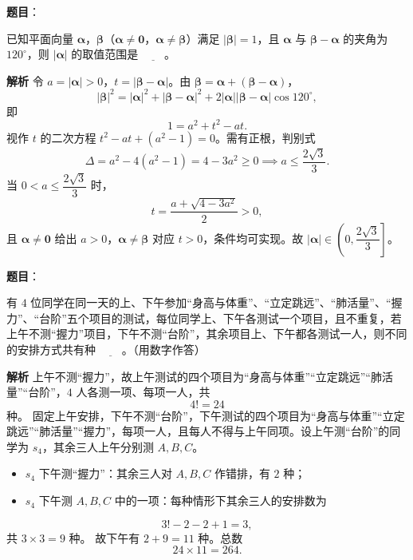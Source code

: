 \begin{answer}

\textbf{题目}：

已知平面向量 $\boldsymbol\alpha$，$\boldsymbol\beta$（$\boldsymbol\alpha\neq\mathbf 0$，$\boldsymbol\alpha\neq\boldsymbol\beta$）满足 $|\boldsymbol\beta|=1$，且 $\boldsymbol\alpha$ 与 $\boldsymbol\beta-\boldsymbol\alpha$ 的夹角为 $120^\circ$，则 $|\boldsymbol\alpha|$ 的取值范围是 $\underline{\qquad}$。

\textbf{解析}
令 $a=|\boldsymbol\alpha|>0$，$t=|\boldsymbol\beta-\boldsymbol\alpha|$。由 $\boldsymbol\beta=\boldsymbol\alpha+(\boldsymbol\beta-\boldsymbol\alpha)$，
\nopagebreak[4]
\[|\boldsymbol\beta|^2=|\boldsymbol\alpha|^2+|\boldsymbol\beta-\boldsymbol\alpha|^2
+2|\boldsymbol\alpha||\boldsymbol\beta-\boldsymbol\alpha|\cos120^\circ,\]
即
\nopagebreak[4]
\[1=a^2+t^2-at.\]
视作 $t$ 的二次方程 $t^2-at+(a^2-1)=0$。需有正根，判别式
\nopagebreak[4]
\[\Delta=a^2-4(a^2-1)=4-3a^2\geqslant0\implies a\leqslant\frac{2\sqrt3}3.\]
当 $0<a\leqslant\dfrac{2\sqrt3}3$ 时，
\nopagebreak[4]
\[t=\frac{a+\sqrt{4-3a^2}}2>0,\]
且 $\boldsymbol\alpha\neq\mathbf0$ 给出 $a>0$，$\boldsymbol\alpha\neq\boldsymbol\beta$ 对应 $t>0$，条件均可实现。故 $|\boldsymbol\alpha|\in\left(0,\dfrac{2\sqrt3}3\right]$。

\gkanswer{答案：$\left(0,\dfrac{2\sqrt3}3\right]$。}

\end{answer}
\begin{answer}

\textbf{题目}：

有 $4$ 位同学在同一天的上、下午参加“身高与体重”、“立定跳远”、“肺活量”、“握力”、“台阶”五个项目的测试，每位同学上、下午各测试一个项目，且不重复，若上午不测“握力”项目，下午不测“台阶”，其余项目上、下午都各测试一人，则不同的安排方式共有种 $\underline{\qquad}$。（用数字作答）

\textbf{解析}
上午不测“握力”，故上午测试的四个项目为“身高与体重”“立定跳远”“肺活量”“台阶”，$4$ 人各测一项、每项一人，共
\nopagebreak[4]
\[4!=24\]
种。
固定上午安排，下午不测“台阶”，下午测试的四个项目为“身高与体重”“立定跳远”“肺活量”“握力”，每项一人，且每人不得与上午同项。设上午测“台阶”的同学为 $s_4$，其余三人上午分别测 $A,B,C$。
\begin{itemize}
\item $s_4$ 下午测“握力”：其余三人对 $A,B,C$ 作错排，有 $2$ 种；
\item $s_4$ 下午测 $A,B,C$ 中的一项：每种情形下其余三人的安排数为
\end{itemize}
\nopagebreak[4]
\[3!-2-2+1=3,\]
共 $3\times3=9$ 种。
故下午有 $2+9=11$ 种。总数
\nopagebreak[4]
\[24\times11=264.\]


\end{answer}
